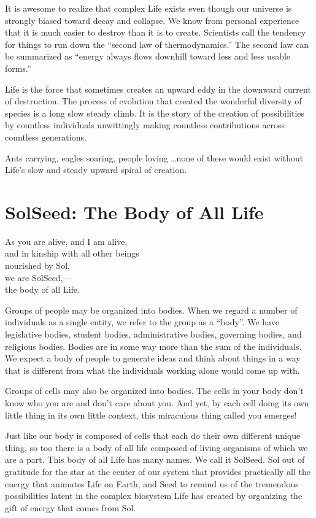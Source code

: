 \documentclass[ebook,12pt,openany,twoside]{memoir}
\newcommand{\tab}{\hspace*{2em}}
\newcommand{\imagefacingchapter}[1]{
  \cleartoverso
  \clearpage \null
  \thispagestyle{cleared}
  \AddToShipoutPictureBG*{%
    \AtStockLowerLeft{%
      \texttt{[image: \#1]}
    }
  }
  \clearpage
}
\begin{document}
It is awesome to realize that complex Life exists even though our universe is
strongly biased toward decay and collapse. We know from personal experience
that it is much easier to destroy than it is to create. Scientists call the
tendency for things to run down the ``second law of thermodynamics.'' The
second law can be summarized as ``energy always flows downhill toward less and
less usable forms.''

Life is the force that sometimes creates an upward eddy in the downward current
of destruction. The process of evolution that created the wonderful diversity
of species is a long slow steady climb. It is the story of the creation of
possibilities by countless individuals unwittingly making countless
contributions across countless generations.

Ants carrying, eagles soaring, people loving \ldots none of these would exist
without Life's slow and steady upward spiral of creation.






\imagefacingchapter{images/BodyOfAllLife-cropped}
\chapter{SolSeed: The Body of All Life}

\setlength\epigraphwidth{2.4in}
\epigraph{
  As you are alive, and I am alive,\\
  and in kinship with all other beings\\
  nourished by Sol,\\
  \tab we are SolSeed,--- \\
  \tab the body of all Life.
}{}

\noindent Groups of people may be organized into bodies. When we regard a
number of individuals as a single entity, we refer to the group as a ``body''.
We have legislative bodies, student bodies, administrative bodies, governing
bodies, and religious bodies. Bodies are in some way more than the sum of the
individuals. We expect a body of people to generate ideas and think about
things in a way that is different from what the individuals working alone would
come up with.

Groups of cells may also be organized into bodies.  The cells in your body don't
know who you are and don't care about you. And yet, by each cell doing its own
little thing in its own little context, this miraculous thing called
you emerges!

Just like our body is composed of cells that each do their own different unique
thing, so too there is a body of all life composed of living organisms of which
we are a part. This body of all Life has many names. We call it SolSeed. Sol
out of gratitude for the star at the center of our system that provides
practically all the energy that animates Life on Earth, and Seed to remind us
of the tremendous possibilities latent in the complex biosystem Life has
created by organizing the gift of energy that comes from Sol.
\end{document}
